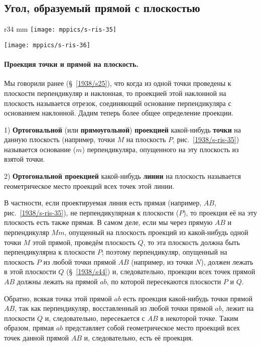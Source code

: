 \subsection*{Угол, образуемый прямой с плоскостью}

\begin{wrapfigure}{r}{34 mm}
\vskip-6mm
\centering
\texttt{[image: mppics/s-ris-35]}
\caption{}\label{1938/s-ris-35}
\bigskip
\texttt{[image: mppics/s-ris-36]}
\caption{}\label{1938/s-ris-36}
\end{wrapfigure}

\paragraph{Проекция точки и прямой на плоскость.}\label{1938/s47}
Мы говорили ранее (§~\ref{1938/s25}), что когда из одной точки проведены к плоскости перпендикуляр и наклонная, то проекцией этой наклонной на плоскость называется отрезок, соединяющий основание перпендикуляра с основанием наклонной.
Дадим теперь более общее определение проекции.

1) \textbf{Ортогональной} (или \textbf{прямоугольной}) \textbf{проекцией} какой-нибудь \textbf{точки} на данную плоскость (например, точки $M$ на плоскость $P$, рис.~\ref{1938/s-ris-35}) называется основание ($m$) перпендикуляра, опущенного на эту плоскость из взятой точки.

2) \textbf{Ортогональной проекцией} какой-нибудь \textbf{линии} на плоскость называется геометрическое место проекций всех точек этой линии.

В частности, если проектируемая линия есть прямая (например, $AB$, рис.~\ref{1938/s-ris-35}), не перпендикулярная к плоскости ($P$), то проекция её на эту плоскость есть также прямая.
В самом деле, если мы через прямую $AB$ и перпендикуляр $Mm$, опущенный на плоскость проекций из какой-нибудь одной точки $M$ этой прямой, проведём плоскость $Q$, то эта плоскость должна быть перпендикулярна к плоскости $P$;
поэтому перпендикуляр, опущенный на плоскость $P$ из любой точки прямой $AB$ (например, из точки $N$), должен лежать в этой плоскости $Q$ (§~\ref{1938/s44}) и, следовательно, проекции всех точек прямой $AB$ должны лежать на прямой $ab$, по которой пересекаются плоскости $P$ и $Q$.

Обратно, всякая точка этой прямой $ab$ есть проекция какой-нибудь точки прямой $AB$, так как перпендикуляр, восставленный из любой точки прямой $ab$, лежит на плоскости $Q$ и, следовательно, пересекается с $AB$ в некоторой точке.
Таким образом, прямая $ab$ представляет собой геометрическое место проекций всех точек данной прямой $AB$ и, следовательно, есть её проекция.

